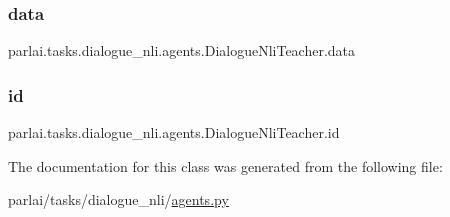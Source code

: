 \subsubsection{\texorpdfstring{data}{data}}
{\footnotesize\ttfamily parlai.\+tasks.\+dialogue\+\_\+nli.\+agents.\+Dialogue\+Nli\+Teacher.\+data}

\mbox{\label{classparlai_1_1tasks_1_1dialogue__nli_1_1agents_1_1DialogueNliTeacher_aec219032386350b637684f9ab46a09ab}} 
\subsubsection{\texorpdfstring{id}{id}}
{\footnotesize\ttfamily parlai.\+tasks.\+dialogue\+\_\+nli.\+agents.\+Dialogue\+Nli\+Teacher.\+id}



The documentation for this class was generated from the following file\+:\begin{DoxyCompactItemize}
\item 
parlai/tasks/dialogue\+\_\+nli/\hyperlink{parlai_2tasks_2dialogue__nli_2agents_8py}{agents.\+py}\end{DoxyCompactItemize}
